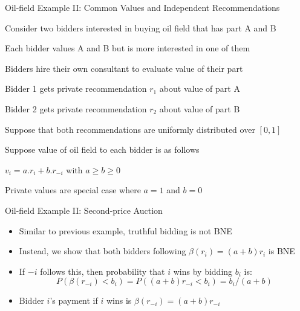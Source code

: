 \documentclass[11pt,aspectratio=169]{beamer}
\begin{document}
  
  \begin{frame}{Oil-field Example II: Common Values and Independent Recommendations}
   \begin{itemizes}[0.6em]
    \item Consider two bidders interested in buying oil field that has part A and B
    \item Each bidder values A and B but is more interested in one of them
    \item Bidders hire their own consultant to evaluate value of their part
    \item Bidder 1 gets private recommendation $r_1$ about value of part A
    \item Bidder 2 gets private recommendation $r_2$ about value of part B 
    \item Suppose that both recommendations are \alert{uniformly distributed} over $[0,1]$
    \item Suppose value of oil field to each bidder is as follows
    \begin{itemizes}[0.4em]
     \item $v_i = a.r_i + b.r_{-i}$ with $a \geq b \geq 0$
     \item Private values are \alert{special case} where $a = 1$ and $b = 0$ 
    \end{itemizes}
   \end{itemizes}
  \end{frame}
  
  
  \begin{frame}{Oil-field Example II: Second-price Auction}
   \begin{itemize}[<+->]
   \setlength{\itemsep}{1.2em}
    \item Similar to previous example, \alert{truthful bidding is not BNE}
    \item Instead, we show that both bidders following $\beta(r_i) = (a + b) r_i$ is BNE
    \item If $-i$ follows this, then probability that $i$ wins by bidding $b_i$ is:
    $$P(\beta(r_{-i}) < b_i) = P((a + b) r_{-i} < b_i) = b_i / (a + b)$$
    \item Bidder $i$'s payment if $i$ wins is $\beta(r_{-i}) = (a + b) r_{-i}$
   \end{itemize}
  \end{frame}
  
\end{document}
